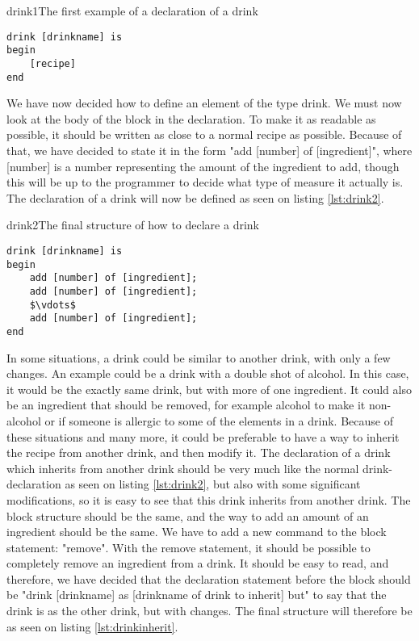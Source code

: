 \begin{code}{drink1}{The first example of a declaration of a drink}
\begin{lstlisting}
drink [drinkname] is
begin
	[recipe]
end
\end{lstlisting}
\end{code}

We have now decided how to define an element of the type drink. We must now look at the body of the block in the declaration. To make it as readable as possible, it should be written as close to a normal recipe as possible. Because of that, we have decided to state it in the form "add [number] of [ingredient]", where [number] is a number representing the amount of the ingredient to add, though this will be up to the programmer to decide what type of measure it actually is. The declaration of a drink will now be defined as seen on listing \ref{lst:drink2}.

\begin{code}{drink2}{The final structure of how to declare a drink}
\begin{lstlisting}[mathescape]
drink [drinkname] is
begin
	add [number] of [ingredient];
	add [number] of [ingredient];
	$\vdots$
	add [number] of [ingredient];
end
\end{lstlisting}
\end{code}

In some situations, a drink could be similar to another drink, with only a few changes. An example could be a drink with a double shot of alcohol. In this case, it would be the exactly same drink, but with more of one ingredient. It could also be an ingredient that should be removed, for example alcohol to make it non-alcohol or if someone is allergic to some of the elements in a drink. Because of these situations and many more, it could be preferable to have a way to inherit the recipe from another drink, and then modify it. The declaration of a drink which inherits from another drink should be very much like the normal drink-declaration as seen on listing \ref{lst:drink2}, but also with some significant modifications, so it is easy to see that this drink inherits from another drink. The block structure should be the same, and the way to add an amount of an ingredient should be the same. We have to add a new command to the block statement: "remove". With the remove statement, it should be possible to completely remove an ingredient from a drink. It should be easy to read, and therefore, we have decided that the declaration statement before the block should be "drink [drinkname] as [drinkname of drink to inherit] but" to say that the drink is as the other drink, but with changes. The final structure will therefore be as seen on listing \ref{lst:drinkinherit}.

